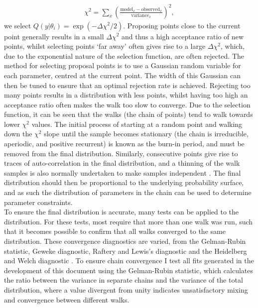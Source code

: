 \documentclass[titlesmallcaps, examinerscopy, copyrightpage]{uqthesis}
\begin{document}
\begin{align}
\chi^2 = \sum_x \left(\frac{\mathrm{model}_x - \mathrm{observed}_x}{\mathrm{variance}_x}\right)^2,
\end{align}
we select $Q(y|\theta_i) = \exp(-\Delta \chi^2 / 2)$. Proposing points close to the current point generally results in a small $\Delta \chi^2$ and thus a high acceptance ratio of new points, whilst selecting points `far away' often gives rise to a large $\Delta \chi^2$, which, due to the exponential nature of the selection function, are often rejected. The method for selecting proposal points is to use a Gaussian random variable for each parameter, centred at the current point. The width of this Gaussian can then be tuned to ensure that an optimal rejection rate is achieved. Rejecting too many points results in a distribution with less points, whilst having too high an acceptance ratio often makes the walk too slow to converge. Due to the selection function, it can be seen that the walks (the chain of points) tend to walk towards lower $\chi^2$ values. The initial process of starting at a random point and walking down the $\chi^2$ slope until the sample becomes stationary (the chain is irreducible, aperiodic, and positive recurrent) is known as the burn-in period, and must be removed from the final distribution. Similarly, consecutive points give rise to traces of auto-correlation in the final distribution, and a thinning of the walk samples is also normally undertaken to make samples independent \citep{Gilks1995markov}. The final distribution should then be proportional to the underlying probability surface, and as such the distribution of parameters in the chain can be used to determine parameter constraints.\\

To ensure the final distribution is accurate, many tests can be applied to the distribution. For these tests, most require that more than one walk was run, such that it becomes possible to confirm that all walks converged to the same distribution. These convergence diagnostics are varied, from the Gelman-Rubin statistic, Geweke diagnostic, Raftery and Lewis's diagnostic and the Heidelberg and Welch diagnostic \citep{CowlesCarlin1996,Gilks1995markov}. To ensure chain convergence I test all fits generated in the development of this document using the Gelman-Rubin statistic, which calculates the ratio between the variance in separate chains and the variance of the total distribution, where a value divergent from unity indicates unsatisfactory mixing and convergence between different walks.\\
\end{document}
